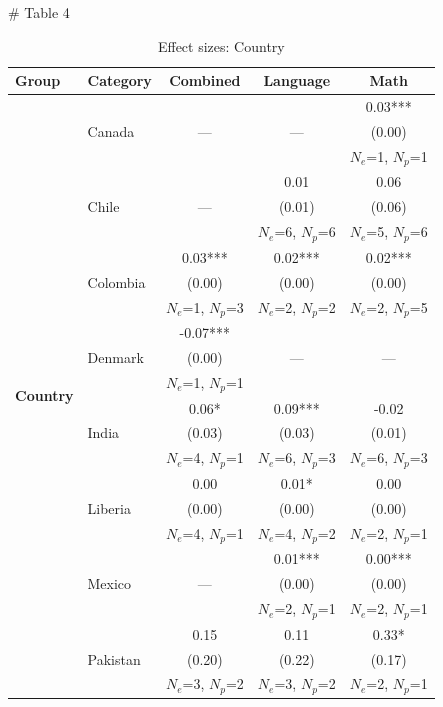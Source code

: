 # Table 4

\renewcommand{\arraystretch}{0.9} %
\begin{table}[htbp]
\centering
\caption{Effect sizes: Country}
\small %
\setlength{\tabcolsep}{5pt} %
\medskip
\begin{tabular*}{\linewidth}{@{\extracolsep{\fill}} l l c c c @{}}
\toprule
\textbf{Group} & \textbf{Category} & \textbf{Combined} & \textbf{Language} & \textbf{Math} \\
\midrule
\multirow{33}{*}{\textbf{Country}}
  &  &  &  & 0.03*** \\
  & Canada & --- & --- & (0.00) \\
  &  &  &  & $N_e$=1, $N_p$=1 \\
\cmidrule(lr){2-5}
  &  &  & 0.01 & 0.06 \\
  & Chile & --- & (0.01) & (0.06) \\
  &  &  & $N_e$=6, $N_p$=6 & $N_e$=5, $N_p$=6 \\
\cmidrule(lr){2-5}
  &  & 0.03*** & 0.02*** & 0.02*** \\
  & Colombia & (0.00) & (0.00) & (0.00) \\
  &  & $N_e$=1, $N_p$=3 & $N_e$=2, $N_p$=2 & $N_e$=2, $N_p$=5 \\
\cmidrule(lr){2-5}
  &  & -0.07*** &  &  \\
  & Denmark & (0.00) & --- & --- \\
  &  & $N_e$=1, $N_p$=1 &  &  \\
\cmidrule(lr){2-5}
  &  & 0.06* & 0.09*** & -0.02 \\
  & India & (0.03) & (0.03) & (0.01) \\
  &  & $N_e$=4, $N_p$=1 & $N_e$=6, $N_p$=3 & $N_e$=6, $N_p$=3 \\
\cmidrule(lr){2-5}
  &  & 0.00 & 0.01* & 0.00 \\
  & Liberia & (0.00) & (0.00) & (0.00) \\
  &  & $N_e$=4, $N_p$=1 & $N_e$=4, $N_p$=2 & $N_e$=2, $N_p$=1 \\
\cmidrule(lr){2-5}
  &  &  & 0.01*** & 0.00*** \\
  & Mexico & --- & (0.00) & (0.00) \\
  &  &  & $N_e$=2, $N_p$=1 & $N_e$=2, $N_p$=1 \\
\cmidrule(lr){2-5}
  &  & 0.15 & 0.11 & 0.33* \\
  & Pakistan & (0.20) & (0.22) & (0.17) \\
  &  & $N_e$=3, $N_p$=2 & $N_e$=3, $N_p$=2 & $N_e$=2, $N_p$=1 \\

\end{tabular*}
\end{table}
